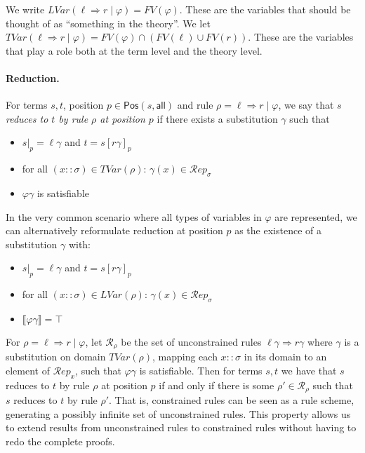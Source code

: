 \documentclass{lmcs}
\theoremstyle{theorem}\newtheorem{theorem}{Theorem}
\theoremstyle{theorem}\newtheorem{lemma}[theorem]{Lemma}
\theoremstyle{theorem}\newtheorem{corollary}[theorem]{Corollary}
\theoremstyle{definition}\newtheorem{definition}[theorem]{Definition}
\theoremstyle{definition}\newtheorem{example}[theorem]{Example}
\newcommand{\thF}{\mathcal{F}_{\mathtt{theory}}}
\newcommand{\thTypes}{\mathcal{Y}_{\mathtt{theory}}}
\newcommand{\Rules}{\mathcal{R}}
\newcommand{\FV}{\mathit{FV}}
\newcommand{\FMV}{\mathit{MV}}
\newcommand{\Positions}{\mathsf{Pos}}
\newcommand{\I}{\mathcal{I}}
\newcommand{\J}{\mathcal{J}}
\newcommand{\Reps}[1]{\mathcal{R}\!\mathit{ep}_{#1}}
\newcommand{\LVar}[1]{\mathit{LVar}(#1)}
\newcommand{\TLVar}[1]{\mathit{TVar}(#1)}
\newcommand{\atype}{\sigma}
\newcommand{\avar}{x}
\newcommand{\arrz}{\Rightarrow}
\newcommand{\interpret}[1]{\llbracket #1 \rrbracket}
\newcommand{\myparagraph}[1]{\paragraph{\textbf{#1.}}}
\begin{document}
We write $\LVar{\ell \arrz r \mid \varphi} = \FV(\varphi)$.  These are the
variables that should be thought of as ``something in the theory''.
We let $\TLVar{\ell \arrz r \mid \varphi} = \FV(\varphi) \cap (\FV(\ell) \cup
\FV(r))$.  These are the variables that play a role both at the term level and
the theory level.

\myparagraph{Reduction}
For terms $s,t$, position $p \in \Positions(s,\mathsf{all})$ and rule $\rho =
\ell \arrz r \mid \varphi$, we say that \emph{$s$ reduces to $t$ by rule $\rho$
at position $p$} if there exists a substitution $\gamma$ such that
\begin{itemize}
\item $s|_p = \ell\gamma$ and $t = s[r\gamma]_p$
\item for all $(\avar :: \atype) \in \TLVar{\rho}$:
  $\gamma(\avar) \in \Reps{\atype}$
\item $\varphi\gamma$ is satisfiable
\end{itemize}

In the very common scenario where all types of variables in $\varphi$ are
represented, we can alternatively reformulate reduction at position $p$ as the
existence of a substitution $\gamma$ with:
\begin{itemize}
\item $s|_p = \ell\gamma$ and $t = s[r\gamma]_p$
\item for all $(\avar :: \atype) \in \LVar{\rho}$:
  $\gamma(\avar) \in \Reps{\atype}$
\item $\interpret{\varphi\gamma} = \top$
\end{itemize}

For $\rho = \ell \arrz r \mid \varphi$, let $\Rules_\rho$ be the set of
unconstrained rules $\ell\gamma \arrz r\gamma$ where $\gamma$ is a
substitution on domain $\TLVar{\rho}$, mapping each $\avar :: \atype$ in its
domain to an element of $\Reps{\avar}$, such that $\varphi\gamma$ is
satisfiable.
Then for terms $s,t$ we have that $s$ reduces to $t$ by rule $\rho$ at position
$p$ if and only if there is some $\rho' \in \Rules_\rho$ such that $s$ reduces
to $t$ by rule $\rho'$.  That is, constrained rules can be seen as a rule
scheme, generating a possibly infinite set of unconstrained rules.  This
property allows us to extend results from unconstrained rules to constrained
rules without having to redo the complete proofs.
\end{document}
